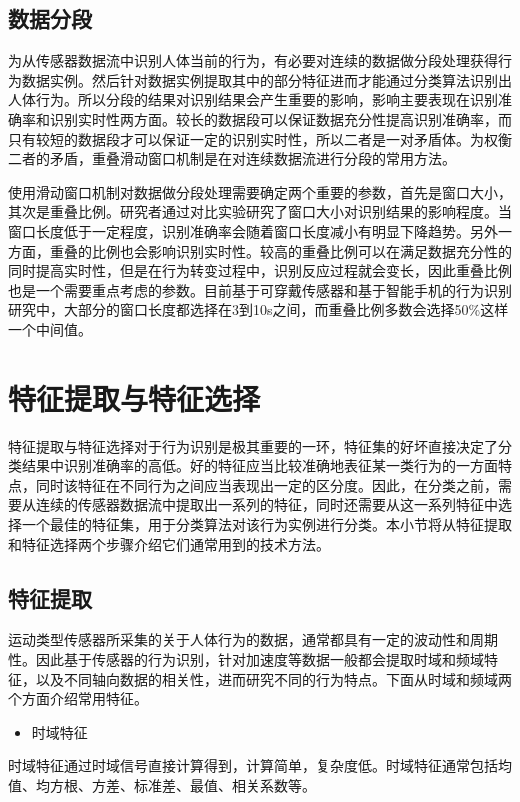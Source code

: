 \subsection{数据分段}
\par 为从传感器数据流中识别人体当前的行为，有必要对连续的数据做分段处理获得行为数据实例。然后针对数据实例提取其中的部分特征进而才能通过分类算法识别出人体行为。所以分段的结果对识别结果会产生重要的影响，影响主要表现在识别准确率和识别实时性两方面。较长的数据段可以保证数据充分性提高识别准确率，而只有较短的数据段才可以保证一定的识别实时性，所以二者是一对矛盾体。为权衡二者的矛盾，重叠滑动窗口机制是在对连续数据流进行分段的常用方法。
\par 使用滑动窗口机制对数据做分段处理需要确定两个重要的参数，首先是窗口大小，其次是重叠比例。研究者通过对比实验研究了窗口大小对识别结果的影响程度。当窗口长度低于一定程度，识别准确率会随着窗口长度减小有明显下降趋势。另外一方面，重叠的比例也会影响识别实时性。较高的重叠比例可以在满足数据充分性的同时提高实时性，但是在行为转变过程中，识别反应过程就会变长，因此重叠比例也是一个需要重点考虑的参数。目前基于可穿戴传感器和基于智能手机的行为识别研究中，大部分的窗口长度都选择在3到10s之间，而重叠比例多数会选择50\%这样一个中间值。

\section{特征提取与特征选择}
\par 特征提取与特征选择对于行为识别是极其重要的一环，特征集的好坏直接决定了分类结果中识别准确率的高低。好的特征应当比较准确地表征某一类行为的一方面特点，同时该特征在不同行为之间应当表现出一定的区分度。因此，在分类之前，需要从连续的传感器数据流中提取出一系列的特征，同时还需要从这一系列特征中选择一个最佳的特征集，用于分类算法对该行为实例进行分类。本小节将从特征提取和特征选择两个步骤介绍它们通常用到的技术方法。

\subsection{特征提取}
\par 运动类型传感器所采集的关于人体行为的数据，通常都具有一定的波动性和周期性。因此基于传感器的行为识别，针对加速度等数据一般都会提取时域和频域特征，以及不同轴向数据的相关性，进而研究不同的行为特点。下面从时域和频域两个方面介绍常用特征。

\begin{itemize}
	\item 时域特征
\end{itemize}
\par 时域特征通过时域信号直接计算得到，计算简单，复杂度低。时域特征通常包括均值、均方根、方差、标准差、最值、相关系数等。

